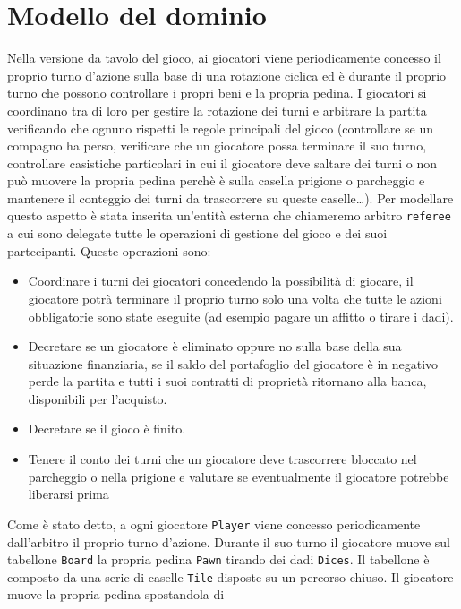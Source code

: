 \section{Modello del dominio}
Nella versione da tavolo del gioco, ai giocatori viene periodicamente concesso il proprio turno d'azione 
sulla base di una rotazione ciclica ed è durante il proprio turno che possono
controllare i propri beni e la propria pedina.
I giocatori si coordinano tra di loro
per gestire la rotazione dei turni e arbitrare la partita verificando che ognuno rispetti le 
regole principali del gioco (controllare se un compagno ha perso, verificare che un giocatore possa terminare il suo turno, controllare casistiche particolari
in cui il giocatore deve saltare dei turni o non può muovere la propria pedina perchè è sulla casella prigione
o parcheggio e mantenere il conteggio dei turni da trascorrere su queste caselle\dots).\newline
Per modellare questo aspetto è stata inserita un'entità esterna che chiameremo arbitro \texttt{referee} a cui sono delegate
tutte le operazioni di gestione del gioco e dei suoi partecipanti. 
Queste operazioni sono:
\begin{itemize}
    \item
    Coordinare i turni dei giocatori concedendo la possibilità di giocare, 
    il giocatore potrà terminare il proprio turno solo una volta che tutte le azioni obbligatorie sono state eseguite 
    (ad esempio pagare un affitto o tirare i dadi).
    \item 
    Decretare se un giocatore è eliminato oppure no sulla base della sua situazione finanziaria,
    se il saldo del portafoglio del giocatore è in negativo perde la partita e tutti i suoi contratti di proprietà
    ritornano alla banca, disponibili per l’acquisto. 
    \item
    Decretare se il gioco è finito.
    \item Tenere il conto dei turni che un giocatore deve trascorrere bloccato nel parcheggio o nella prigione e valutare se 
    eventualmente il giocatore potrebbe liberarsi prima
\end{itemize}
Come è stato detto, a ogni giocatore \texttt{Player} viene concesso periodicamente dall'arbitro il proprio turno d’azione.
Durante il suo turno il giocatore muove sul tabellone \texttt{Board} la propria pedina \texttt{Pawn} tirando dei dadi \texttt{Dices}.
Il tabellone è composto da una serie di caselle  \texttt{Tile} disposte su un percorso chiuso. Il giocatore muove la propria pedina spostandola di 
